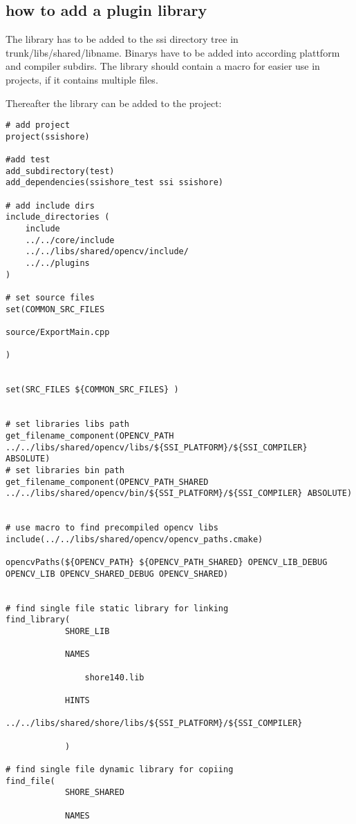 \documentclass[
10pt, %
a4paper, %
oneside, %
headinclude,footinclude, %
BCOR5mm, %
]{scrartcl}
\begin{document}
\subsection{how to add a plugin library}

The library has to be added to the ssi directory tree in trunk/libs/shared/libname.
Binarys have to be added into according plattform and compiler subdirs.
The library should contain a macro for easier use in projects, if it contains multiple files.

Thereafter the library can be added to the project:



\label{subsec:how to add a plugin library}
\begin{lstlisting}[caption={cmake ssi plugins library}]
# add project
project(ssishore)

#add test
add_subdirectory(test)
add_dependencies(ssishore_test ssi ssishore)

# add include dirs
include_directories (
	include
	../../core/include
	../../libs/shared/opencv/include/
	../../plugins
)

# set source files
set(COMMON_SRC_FILES

source/ExportMain.cpp

)


set(SRC_FILES ${COMMON_SRC_FILES} )


# set libraries libs path
get_filename_component(OPENCV_PATH ../../libs/shared/opencv/libs/${SSI_PLATFORM}/${SSI_COMPILER} ABSOLUTE)
# set libraries bin path
get_filename_component(OPENCV_PATH_SHARED ../../libs/shared/opencv/bin/${SSI_PLATFORM}/${SSI_COMPILER} ABSOLUTE)


# use macro to find precompiled opencv libs
include(../../libs/shared/opencv/opencv_paths.cmake)

opencvPaths(${OPENCV_PATH} ${OPENCV_PATH_SHARED} OPENCV_LIB_DEBUG OPENCV_LIB OPENCV_SHARED_DEBUG OPENCV_SHARED)

					
# find single file static library for linking
find_library(
			SHORE_LIB
			
			NAMES
				
				shore140.lib		 

			HINTS
				../../libs/shared/shore/libs/${SSI_PLATFORM}/${SSI_COMPILER}
			
			)

# find single file dynamic library for copiing
find_file(
			SHORE_SHARED
			
			NAMES
				

\end{lstlisting}
\end{document}

